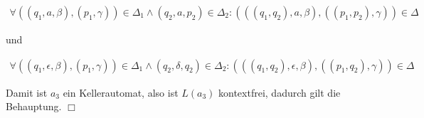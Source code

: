 \documentclass[12pt, a4paper]{article}
\begin{document}
\begin{align*}
\forall ((q_1, a, \beta), (p_1, \gamma)) \in \Delta_1 \wedge (q_2, a, p_2) \in \Delta_2: (((q_1, q_2), a, \beta), ((p_1, p_2), \gamma)) \in \Delta
\end{align*}

und

\begin{align*}
\forall ((q_1, \epsilon, \beta), (p_1, \gamma)) \in \Delta_1 \wedge (q_2, \delta, q_2) \in \Delta_2: (((q_1, q_2), \epsilon, \beta), ((p_1, q_2), \gamma)) \in \Delta
\end{align*}

Damit ist $a_3$ ein Kellerautomat, also ist $L(a_3)$ kontextfrei, dadurch gilt die Behauptung.
\hfill $\Box$\\
\end{document}
